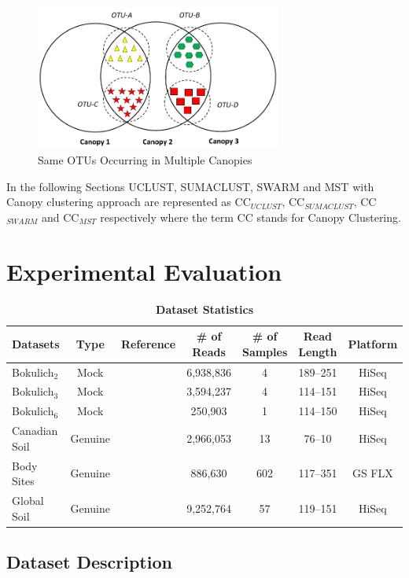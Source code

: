 \documentclass[10pt, conference, compsocconf]{IEEEtran}
\begin{document}
\begin{figure}
	\centering
	\includegraphics[width=\linewidth,height=4.8cm]{merge.pdf}	
	\caption{Same OTUs Occurring in Multiple Canopies}
	\label{fig:merge}
\end{figure}  
In the following Sections UCLUST, SUMACLUST, SWARM and MST with Canopy clustering approach are represented as CC$_{UCLUST}$, CC$_{SUMACLUST}$, CC$_{SWARM}$ and CC$_{MST}$ respectively where the term CC stands for Canopy Clustering. 

\section{Experimental Evaluation}
\begin{table}[tb] 
\centering 
\caption{\textbf{Dataset Statistics}} \label{table:finaltabledataset} 
\begin{tabular}{|l| c c c c c c|} 
\hline
\multicolumn{1}{|c|}{{\bf{Datasets}}} & \multicolumn{1}{c}{{\bf{Type}}} & {\bf{Reference}} & {\bf{\# of Reads}} & {\bf{\# of Samples}} & {\bf{Read Length}} & {\bf{Platform}}\\
\hline
{Bokulich$_2$} & Mock & \cite{MARmockDatasetRef} & 6,938,836 & 4 & 189--251 & HiSeq\\
{Bokulich$_3$} & Mock & \cite{MARmockDatasetRef} & 3,594,237 & 4 & 114--151 & HiSeq\\
{Bokulich$_6$} & Mock & \cite{MARmockDatasetRef} & 250,903 & 1 & 114--150 & HiSeq\\
{Canadian Soil} & Genuine & \cite{MARcanadianSoil} & 2,966,053 & 13 & 76--10 & HiSeq\\
{Body Sites} & Genuine & \cite{MARbodySites} & 886,630 & 602 & 117--351 & GS FLX\\
{Global Soil} & Genuine & \cite{MARglobalSoil} & 9,252,764 & 57 & 119--151 & HiSeq\\
\hline
\end{tabular}
\end{table} 

\subsection{\textbf{Dataset Description}}
\end{document}
